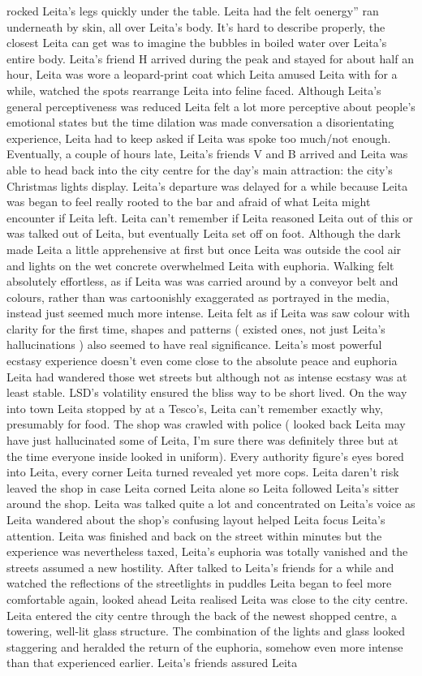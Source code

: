 \documentclass[12pt]{book}
\begin{document}
rocked Leita's legs quickly under the table. Leita had the felt oenergy'' ran underneath by skin, all over Leita's body. It's hard to describe properly, the closest Leita can get was to imagine the bubbles in boiled water over Leita's entire body. Leita's friend H arrived during the peak and stayed for about half an hour, Leita was wore a leopard-print coat which Leita amused Leita with for a while, watched the spots rearrange Leita into feline faced. Although Leita's general perceptiveness was reduced Leita felt a lot more perceptive about people's emotional states but the time dilation was made conversation a disorientating experience, Leita had to keep asked if Leita was spoke too much/not enough. Eventually, a couple of hours late, Leita's friends V and B arrived and Leita was able to head back into the city centre for the day's main attraction: the city's Christmas lights display. Leita's departure was delayed for a while because Leita was began to feel really rooted to the bar and afraid of what Leita might encounter if Leita left. Leita can't remember if Leita reasoned Leita out of this or was talked out of Leita, but eventually Leita set off on foot. Although the dark made Leita a little apprehensive at first but once Leita was outside the cool air and lights on the wet concrete overwhelmed Leita with euphoria. Walking felt absolutely effortless, as if Leita was was carried around by a conveyor belt and colours, rather than was cartoonishly exaggerated as portrayed in the media, instead just seemed much more intense. Leita felt as if Leita was saw colour with clarity for the first time, shapes and patterns ( existed ones, not just Leita's hallucinations ) also seemed to have real significance. Leita's most powerful ecstasy experience doesn't even come close to the absolute peace and euphoria Leita had wandered those wet streets but although not as intense ecstasy was at least stable. LSD's volatility ensured the bliss way to be short lived. On the way into town Leita stopped by at a Tesco's, Leita can't remember exactly why, presumably for food. The shop was crawled with police ( looked back Leita may have just hallucinated some of Leita, I'm sure there was definitely three but at the time everyone inside looked in uniform). Every authority figure's eyes bored into Leita, every corner Leita turned revealed yet more cops. Leita daren't risk leaved the shop in case Leita corned Leita alone so Leita followed Leita's sitter around the shop. Leita was talked quite a lot and concentrated on Leita's voice as Leita wandered about the shop's confusing layout helped Leita focus Leita's attention. Leita was finished and back on the street within minutes but the experience was nevertheless taxed, Leita's euphoria was totally vanished and the streets assumed a new hostility. After talked to Leita's friends for a while and watched the reflections of the streetlights in puddles Leita began to feel more comfortable again, looked ahead Leita realised Leita was close to the city centre. Leita entered the city centre through the back of the newest shopped centre, a towering, well-lit glass structure. The combination of the lights and glass looked staggering and heralded the return of the euphoria, somehow even more intense than that experienced earlier. Leita's friends assured Leita 
\end{document}
